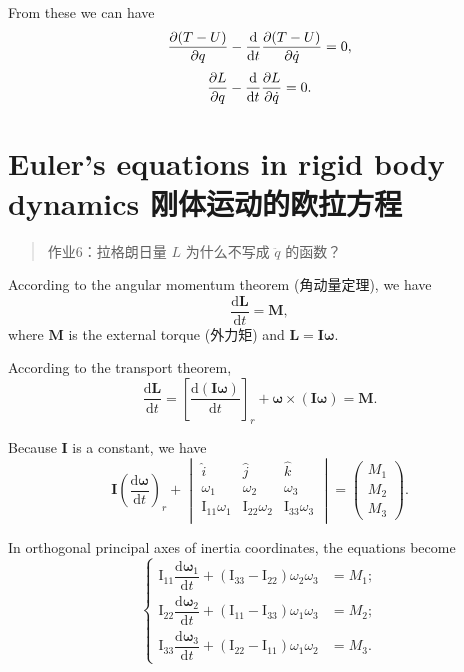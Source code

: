 From these we can have
\[{\partial (T - U) \over \partial q} - \dfrac{\mathrm{d}}{\mathrm{d}t} {\partial (T - U) \over \partial \dot{q}} = 0,\]
\[{\partial L \over \partial q} - \dfrac{\mathrm{d}}{\mathrm{d}t} {\partial L \over \partial \dot{q}} = 0.\]

\section{Euler's equations in rigid body dynamics
刚体运动的欧拉方程}\label{eulers-equations-in-rigid-body-dynamics-ux521aux4f53ux8fd0ux52a8ux7684ux6b27ux62c9ux65b9ux7a0b}

\begin{quote}
作业6：拉格朗日量 \(L\) 为什么不写成 \(\ddot q\) 的函数？
\end{quote}

According to the angular momentum theorem (角动量定理), we have
\[\dfrac{\mathrm d \boldsymbol L}{\mathrm dt} = \boldsymbol M,\] where
\(\boldsymbol M\) is the external torque (外力矩) and
\(\boldsymbol L = \mathbf I \boldsymbol \omega\).

According to the transport theorem,
\[\dfrac{\mathrm d \boldsymbol L}{\mathrm dt} = \left[ \dfrac{\mathrm d (\mathbf I \boldsymbol \omega)}{\mathrm dt}\right]_r + \boldsymbol \omega \times (\mathbf I \boldsymbol \omega) = \boldsymbol M.\]

Because \(\mathbf I\) is a constant, we have
\[\mathbf I \left( \dfrac{\mathrm d \boldsymbol \omega}{\mathrm dt} \right)_r + \begin{vmatrix}
    \hat i & \hat j & \hat k \\
    \omega_1 & \omega_2 & \omega_3 \\
    \mathrm I_{11} \omega_1 & \mathrm I_{22} \omega_2 & \mathrm I_{33} \omega_3 \\
\end{vmatrix} =
\begin{pmatrix}
    M_1 \\ M_2 \\ M_3
\end{pmatrix}.\]

In orthogonal principal axes of inertia coordinates, the equations
become \[\left\{
    \begin{aligned}
        \mathrm I_{11} \dfrac{\mathrm d \boldsymbol \omega_1}{\mathrm dt} + (\mathrm I_{33} - \mathrm I_{22}) \omega_2 \omega_3 & = M_1; \\
        \mathrm I_{22} \dfrac{\mathrm d \boldsymbol \omega_2}{\mathrm dt} + (\mathrm I_{11} - \mathrm I_{33}) \omega_1 \omega_3 & = M_2; \\
        \mathrm I_{33} \dfrac{\mathrm d \boldsymbol \omega_3}{\mathrm dt} + (\mathrm I_{22} - \mathrm I_{11}) \omega_1 \omega_2 & = M_3.
    \end{aligned}
\right.\]

